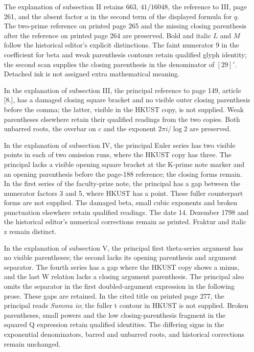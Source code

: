 The explanation of subsection II retains $663$, $41/16048$, the reference to III, page 261, and the absent factor $a$ in the second term of the displayed formula for $q$. The two-prime reference on printed page 265 and the missing closing parenthesis after the reference on printed page 264 are preserved. Bold and italic $L$ and $M$ follow the historical editor’s explicit distinctions. The faint numerator $9$ in the coefficient for beta and weak parenthesis contours retain qualified glyph identity; the second scan supplies the closing parenthesis in the denominator of $[29]'$. Detached ink is not assigned extra mathematical meaning.


In the explanation of subsection III, the principal reference to page 149, article [8.], has a damaged closing square bracket and no visible outer closing parenthesis before the comma; the latter, visible in the HKUST copy, is not supplied. Weak parentheses elsewhere retain their qualified readings from the two copies. Both unbarred roots, the overbar on $c$ and the exponent $2\pi i/\log2$ are preserved.


In the explanation of subsection IV, the principal Euler series has two visible points in each of two omission runs, where the HKUST copy has three. The principal lacks a visible opening square bracket at the K-prime note marker and an opening parenthesis before the page-188 reference; the closing forms remain. In the first series of the faculty-prize note, the principal has a gap between the numerator factors 3 and 5, where HKUST has a point. These fuller counterpart forms are not supplied. The damaged beta, small cubic exponents and broken punctuation elsewhere retain qualified readings. The date 14. Dezember 1798 and the historical editor’s numerical corrections remain as printed. Fraktur and italic z remain distinct.

In the explanation of subsection V, the principal first theta-series argument has no visible parentheses; the second lacks its opening parenthesis and argument separator. The fourth series has a gap where the HKUST copy shows a minus, and the last W relation lacks a closing argument parenthesis. The principal also omits the separator in the first doubled-argument expression in the following prose. These gaps are retained. In the cited title on printed page 277, the principal reads \textit{Summa io}; the fuller t contour in HKUST is not supplied. Broken parentheses, small powers and the low closing-parenthesis fragment in the squared Q expression retain qualified identities. The differing signs in the exponential denominators, barred and unbarred roots, and historical corrections remain unchanged.

